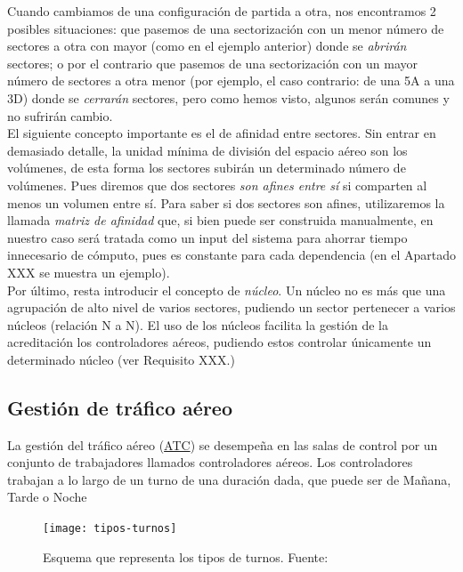 Cuando cambiamos de una configuración de partida a otra, nos encontramos 2 posibles situaciones: que pasemos de una sectorización
con un menor número de sectores a otra con mayor (como en el ejemplo anterior) donde se \textit{abrirán} sectores; o por el
contrario que pasemos de una sectorización con un mayor número de sectores a otra menor (por ejemplo, el caso contrario: de una 5A a una 3D)
donde se \textit{cerrarán} sectores, pero como hemos visto, algunos serán comunes y no sufrirán cambio.
\\

El siguiente concepto importante es el de afinidad entre sectores. Sin entrar en demasiado detalle, la unidad mínima de
división del espacio aéreo son los volúmenes, de esta forma los sectores subirán un determinado número de volúmenes.
Pues diremos que dos sectores \textit{son afines entre sí} si comparten al menos un volumen entre sí. Para saber si dos
sectores son afines, utilizaremos la llamada \textit{matriz de afinidad} que, si bien puede ser construida manualmente,
en nuestro caso será tratada como un input del sistema para ahorrar tiempo innecesario de cómputo, pues es constante para
cada dependencia (en el Apartado XXX se muestra un ejemplo). %
\\

Por último, resta introducir el concepto de \textit{núcleo}. Un núcleo no es más que una agrupación de alto nivel de
varios sectores, pudiendo un sector pertenecer a varios núcleos (relación N a N). El uso de los núcleos facilita la
gestión de la acreditación los controladores aéreos, pudiendo estos controlar únicamente un determinado núcleo (ver Requisito XXX.) %



\subsection{Gestión de tráfico aéreo}
La gestión del tráfico aéreo (\hyperref[ATC]{ATC}) se desempeña en las salas de control por un conjunto de trabajadores llamados controladores aéreos. Los controladores trabajan a lo largo de un turno de una duración dada, que puede ser de Mañana, Tarde o Noche




\begin{figure}
	\centering
	\texttt{[image: tipos-turnos]}
	\caption{Esquema que representa los tipos de turnos. Fuente:~\cite{articulo1}}
	\label{fig:tipos-turnos}
\end{figure}








